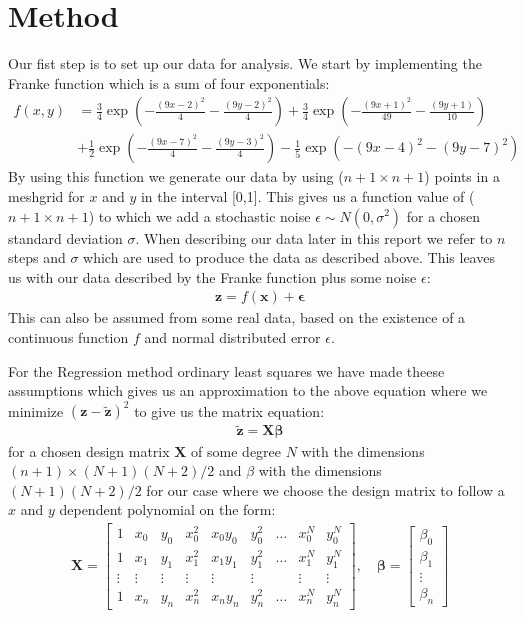 \documentclass[12pt]{article}
\begin{document}
\section{Method}
Our fist step is to set up our data for analysis. We start by implementing the Franke function which is a sum of four exponentials:
\begin{align*}
  f(x,y) &= \frac{3}{4 }\exp\left(- \frac{(9x -2 )^2}{4} - \frac{(9y-2)^2}{4}\right) +\frac{3}{4}\exp{\left(-\frac{(9x+1)^2}{49}- \frac{(9y+1)}{10}\right)} \\
&+\frac{1}{2}\exp{\left(-\frac{(9x-7)^2}{4} - \frac{(9y-3)^2}{4}\right)} -\frac{1}{5}\exp{\left( -(9x-4)^2 - (9y-7)^2\right) }
\end{align*}
By using this function we generate our data by using ($n+1\times n+1$) points in a meshgrid for $x$ and $y$ in the interval [0,1]. This gives us a function value of ($n+1 \times n+1$) to which we add a stochastic noise $\epsilon \sim N(0,\sigma^2)$ for a chosen standard deviation $\sigma$. When describing our data later in this report we refer to $n$ steps and $\sigma$ which are used to produce the data as described above. This leaves us with our data described by the Franke function plus some noise $\epsilon$:
\begin{align*}
  \boldsymbol{z} = f(\boldsymbol{x}) + \boldsymbol{\epsilon}
\end{align*}
This can also be assumed from some real data, based on the existence of a continuous function $f$ and normal distributed error $\epsilon$.

For the Regression method ordinary least squares we have made theese assumptions which gives us an approximation to the above equation where we minimize $(\boldsymbol{z} - \boldsymbol{\tilde{z}})^2$ to give us the matrix equation:
\begin{align*}
  \boldsymbol{\tilde{z}} = \boldsymbol{X}\boldsymbol{\beta}
\end{align*}
for a chosen design matrix $\boldsymbol{X}$ of some degree $N$ with the dimensions $(n+1)\times (N+1)(N+2)/2$ and $\beta$ with the dimensions $(N+1)(N+2)/2$ for our case where we choose the design matrix to follow a $x$ and $y$ dependent polynomial on the form:
\begin{align*}
  \boldsymbol{X} = \begin{bmatrix}
    1 & x_0 & y_0 & x_0^2 & x_0y_0 & y_0^2 & \hdots &x_0^N & y_0^N \\
    1 & x_1 & y_1 & x_1^2 & x_1y_1 & y_1^2 &\hdots& x_1^N & y_1^N \\
    \vdots & \vdots & \vdots & \vdots & \vdots &\vdots & &\vdots & \vdots \\
    1 & x_n & y_n & x_n^2 & x_ny_n & y_n^2 &\hdots& x_n^N & y_n^N
\end{bmatrix}
, \quad
\boldsymbol{\beta} =
\begin{bmatrix}
  \beta_0 \\
  \beta_1 \\
  \vdots \\
  \beta_n
\end{bmatrix}
\end{align*}
\end{document}
